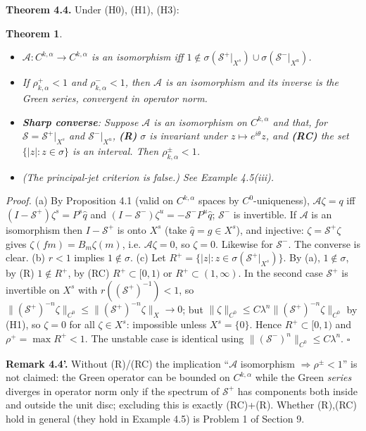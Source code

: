 \documentclass[11pt,a4paper]{article}
\theoremstyle{plain}
\newtheorem{theorem}{Theorem}[section]
\theoremstyle{definition}
\theoremstyle{remark}
\numberwithin{equation}{section}
\numberwithin{figure}{section}
\begin{document}
\textbf{Theorem 4.4.} Under (H0), (H1), (H3):

\begin{theorem}
    \begin{itemize}
        \item[(a)] $\mathcal A:C^{k,\alpha}\to C^{k,\alpha}$ is an isomorphism iff $1\notin\sigma(\mathcal S^+|_{X^s})\cup\sigma(\mathcal S^-|_{X^u})$.
        \item[(b)] If $\rho^+_{k,\alpha}<1$ and $\rho^-_{k,\alpha}<1$, then $\mathcal A$ is an isomorphism and its inverse is the Green series, convergent in operator norm.
        \item[(c)] \textbf{Sharp converse}: Suppose $\mathcal A$ is an isomorphism on $C^{k,\alpha}$ and that, for $\mathcal S=\mathcal S^+|_{X^s}$ and $\mathcal S^-|_{X^u}$, \textbf{(R)} $\sigma$ is invariant under $z\mapsto e^{i\theta}z$, and \textbf{(RC)} the set $\{|z|:z\in\sigma\}$ is an interval. Then $\rho^\pm_{k,\alpha}<1$.
        \item[(d)] (The principal-jet criterion is false.) See Example 4.5(iii).
    \end{itemize}
\end{theorem}

\textit{Proof.} (a) By Proposition 4.1 (valid on $C^{k,\alpha}$ spaces by $C^0$-uniqueness), $\mathcal A\zeta=q$ iff $(I-\mathcal S^+)\zeta^s=P^s\hat q$ and $(I-\mathcal S^-)\zeta^u=-\mathcal S^-P^u\hat q$; $\mathcal S^-$ is invertible. If $\mathcal A$ is an isomorphism then $I-\mathcal S^+$ is onto $X^s$ (take $\hat q=g\in X^s$), and injective: $\zeta=\mathcal S^+\zeta$ gives $\zeta(fm)=B_m\zeta(m)$, i.e. $\mathcal A\zeta=0$, so $\zeta=0$. Likewise for $\mathcal S^-$. The converse is clear.
(b) $r<1$ implies $1\notin\sigma$.
(c) Let $R^+=\{|z|:z\in\sigma(\mathcal S^+|_{X^s})\}$. By (a), $1\notin\sigma$, by (R) $1\notin R^+$, by (RC) $R^+\subset[0,1)$ or $R^+\subset(1,\infty)$. In the second case $\mathcal S^+$ is invertible on $X^s$ with $r((\mathcal S^+)^{-1})<1$, so $\|(\mathcal S^+)^{-n}\zeta\|_{C^0}\le\|(\mathcal S^+)^{-n}\zeta\|_{X}\to0$; but $\|\zeta\|_{C^0}\le C\lambda^n\|(\mathcal S^+)^{-n}\zeta\|_{C^0}$ by (H1), so $\zeta=0$ for all $\zeta\in X^s$: impossible unless $X^s=\{0\}$. Hence $R^+\subset[0,1)$ and $\rho^+=\max R^+<1$. The unstable case is identical using $\|(\mathcal S^-)^n\|_{C^0}\le C\lambda^n$. $\square$

\textbf{Remark 4.4'.} Without (R)/(RC) the implication ``$\mathcal A$ isomorphism $\Rightarrow\rho^\pm<1$'' is not claimed: the Green operator can be bounded on $C^{k,\alpha}$ while the Green \textit{series} diverges in operator norm only if the spectrum of $\mathcal S^+$ has components both inside and outside the unit disc; excluding this is exactly (RC)+(R). Whether (R),(RC) hold in general (they hold in Example 4.5) is Problem 1 of Section 9.
\end{document}
